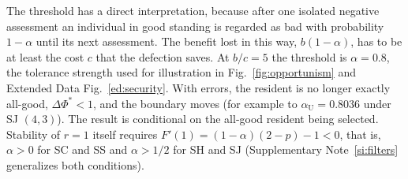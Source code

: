 \documentclass[10pt]{wlscirep}
\newcommand{\dPhi}{\Delta\Phi^{*}}
\theoremstyle{plain}
\theoremstyle{remark}
\begin{document}
The threshold has a direct interpretation, because after one isolated negative assessment an individual in good standing is regarded as bad with probability $1-\alpha$ until its next assessment. The benefit lost in this way, $b(1-\alpha)$, has to be at least the cost $c$ that the defection saves. At $b/c=5$ the threshold is $\alpha=0.8$, the tolerance strength used for illustration in Fig.~\ref{fig:opportunism} and Extended Data Fig.~\ref{ed:security}. With errors, the resident is no longer exactly all-good, $\dPhi<1$, and the boundary moves (for example to $\alpha_{\mathrm U}=0.8036$ under SJ $(4,3)$). The result is conditional on the all-good resident being selected. Stability of $r=1$ itself requires $F'(1)=(1-\alpha)(2-p)-1<0$, that is, $\alpha>0$ for SC and SS and $\alpha>1/2$ for SH and SJ (Supplementary Note~\ref{si:filters} generalizes both conditions).
\end{document}
